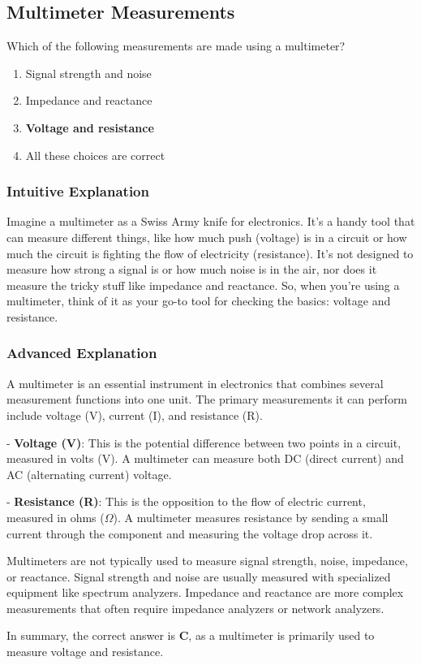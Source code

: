\subsection{Multimeter Measurements}
\label{T7D07}

\begin{tcolorbox}[colback=gray!10!white,colframe=black!75!black,title=T7D07]
Which of the following measurements are made using a multimeter?
\begin{enumerate}[label=\Alph*]
    \item Signal strength and noise
    \item Impedance and reactance
    \item \textbf{Voltage and resistance}
    \item All these choices are correct
\end{enumerate}
\end{tcolorbox}

\subsubsection{Intuitive Explanation}
Imagine a multimeter as a Swiss Army knife for electronics. It’s a handy tool that can measure different things, like how much push (voltage) is in a circuit or how much the circuit is fighting the flow of electricity (resistance). It’s not designed to measure how strong a signal is or how much noise is in the air, nor does it measure the tricky stuff like impedance and reactance. So, when you’re using a multimeter, think of it as your go-to tool for checking the basics: voltage and resistance.

\subsubsection{Advanced Explanation}
A multimeter is an essential instrument in electronics that combines several measurement functions into one unit. The primary measurements it can perform include voltage (V), current (I), and resistance (R). 

- \textbf{Voltage (V)}: This is the potential difference between two points in a circuit, measured in volts (V). A multimeter can measure both DC (direct current) and AC (alternating current) voltage.
  
- \textbf{Resistance (R)}: This is the opposition to the flow of electric current, measured in ohms ($\Omega$). A multimeter measures resistance by sending a small current through the component and measuring the voltage drop across it.

Multimeters are not typically used to measure signal strength, noise, impedance, or reactance. Signal strength and noise are usually measured with specialized equipment like spectrum analyzers. Impedance and reactance are more complex measurements that often require impedance analyzers or network analyzers.

In summary, the correct answer is \textbf{C}, as a multimeter is primarily used to measure voltage and resistance.

